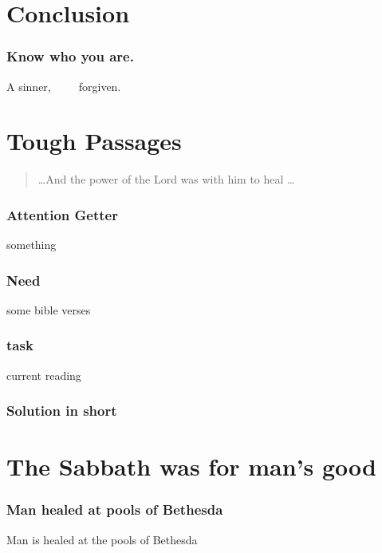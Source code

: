 \documentclass{beamer}
\begin{document}
\section*{Conclusion}
\begin{frame}
\frametitle{Know who you are.}
A sinner,~~~~~forgiven.
\end{frame}

\section*{Tough Passages}

\begin{frame}
\begin{quote}
\dots And the power of the Lord was with him to heal \dots

\end{quote}

\end{frame}


\begin{frame}
\frametitle{Attention Getter}
something
\end{frame}

\begin{frame}
\frametitle{Need}
some bible verses
\end{frame}

\begin{frame}
\frametitle{task}
current reading
\end{frame}

\begin{frame}
\frametitle{Solution in short}
\end{frame}

\begin{frame}
\frametitle{\insertlecture}
\tableofcontents[sectionstyle=show/show]
\end{frame}

\section{The Sabbath was for man's good}
\begin{frame}
\frametitle{Man healed at pools of Bethesda}
Man is healed at the pools of Bethesda 
\end{frame}

\begin{frame}
\frametitle{}
\end{frame}
\end{document}
